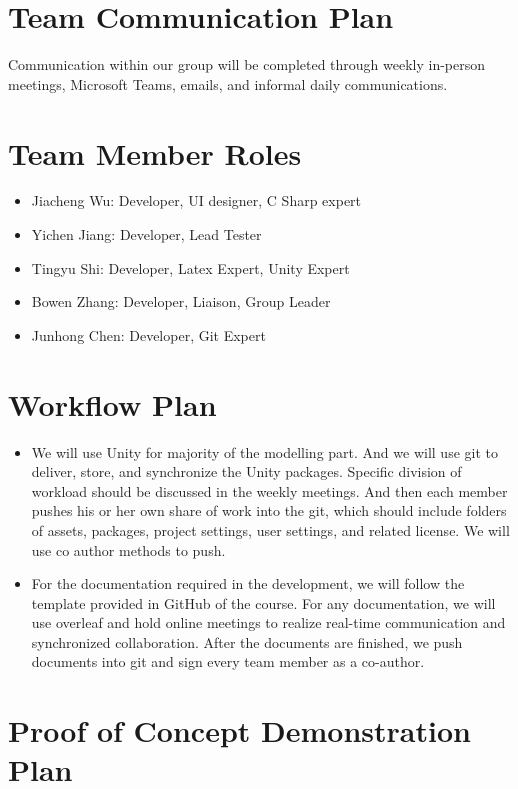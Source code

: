 \documentclass{article}
\begin{document}
\section{Team Communication Plan}
Communication within our group will be completed through weekly in-person meetings, Microsoft Teams, emails, and informal daily communications. 

\section{Team Member Roles}
\begin{itemize}
    \item Jiacheng Wu: Developer, UI designer, C Sharp expert
    \item Yichen Jiang: Developer, Lead Tester
    \item Tingyu Shi: Developer, Latex Expert, Unity Expert
    \item Bowen Zhang: Developer, Liaison, Group Leader
    \item Junhong Chen: Developer, Git Expert
\end{itemize}

\section{Workflow Plan}

\begin{itemize}
	\item We will use Unity for majority of the modelling part. And we will use git to deliver, store, and synchronize the Unity packages. Specific division of workload should be discussed in the weekly meetings. And then each member pushes his or her own share of work into the git, which should include folders of assets, packages, project settings, user settings, and related license. We will use co author methods to push.
	\item For the documentation required in the development, we will follow the template provided in GitHub of the course. For any documentation, we will use overleaf and hold online meetings to realize real-time communication and synchronized collaboration. After the documents are finished, we push documents into git and sign every team member as a co-author. 
\end{itemize}

\section{Proof of Concept Demonstration Plan}
\end{document}
